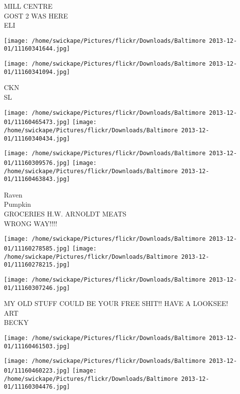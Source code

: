 \documentclass[10pt,letterpaper]{article}
\begin{document}
MILL CENTRE\\
GOST 2 WAS HERE\\
ELI\\
\pagebreak

\texttt{[image: /home/swickape/Pictures/flickr/Downloads/Baltimore 2013-12-01/11160341644.jpg]}

\vspace{0.25in}
\texttt{[image: /home/swickape/Pictures/flickr/Downloads/Baltimore 2013-12-01/11160341094.jpg]}

CKN\\
SL\\
\pagebreak

\texttt{[image: /home/swickape/Pictures/flickr/Downloads/Baltimore 2013-12-01/11160465473.jpg]}
\texttt{[image: /home/swickape/Pictures/flickr/Downloads/Baltimore 2013-12-01/11160340434.jpg]}

\texttt{[image: /home/swickape/Pictures/flickr/Downloads/Baltimore 2013-12-01/11160309576.jpg]}
\texttt{[image: /home/swickape/Pictures/flickr/Downloads/Baltimore 2013-12-01/11160463843.jpg]}

Raven\\
Pumpkin\\
GROCERIES H.W. ARNOLDT MEATS\\
WRONG WAY!!!!\\
\pagebreak

\texttt{[image: /home/swickape/Pictures/flickr/Downloads/Baltimore 2013-12-01/11160278585.jpg]}
\texttt{[image: /home/swickape/Pictures/flickr/Downloads/Baltimore 2013-12-01/11160278215.jpg]}

\vspace{0.25in}
\texttt{[image: /home/swickape/Pictures/flickr/Downloads/Baltimore 2013-12-01/11160307246.jpg]}

MY OLD STUFF COULD BE YOUR FREE SHIT!! HAVE A LOOKSEE!\\
ART\\
BECKY\\
\pagebreak

\texttt{[image: /home/swickape/Pictures/flickr/Downloads/Baltimore 2013-12-01/11160461503.jpg]}

\vspace{0.25in}
\texttt{[image: /home/swickape/Pictures/flickr/Downloads/Baltimore 2013-12-01/11160460223.jpg]}
\texttt{[image: /home/swickape/Pictures/flickr/Downloads/Baltimore 2013-12-01/11160304476.jpg]}
\end{document}
